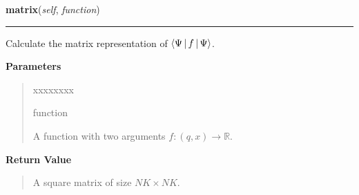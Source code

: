 \hspace{.8\funcindent}\begin{boxedminipage}{\funcwidth}

    \raggedright \textbf{matrix}(\textit{self}, \textit{function})

    \vspace{-1.5ex}

    \rule{\textwidth}{0.5\fboxrule}
\setlength{\parskip}{2ex}
    Calculate the matrix representation of
    $\Braket{\Psi|f|\Psi}$.

\setlength{\parskip}{1ex}
      \textbf{Parameters}
      \vspace{-1ex}

      \begin{quote}
        \begin{Ventry}{xxxxxxxx}

          \item[function]

          A function with two arguments $f:(q, x) \rightarrow
          \mathbb{R}$.

        \end{Ventry}

      \end{quote}

      \textbf{Return Value}
    \vspace{-1ex}

      \begin{quote}
      A square matrix of size $NK \times NK$.

      \end{quote}

    \end{boxedminipage}

    \label{HagedornWavepacket:HagedornWavepacket:get_norm}

    \vspace{0.5ex}

